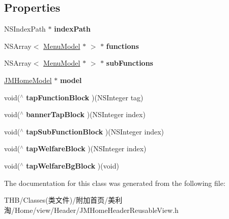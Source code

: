 \subsection*{Properties}
\begin{DoxyCompactItemize}
\item 
\mbox{\label{interface_j_m_home_header_reusable_view_adb50b2a776913d1db70bd35eedb8aba3}} 
N\+S\+Index\+Path $\ast$ {\bfseries index\+Path}
\item 
\mbox{\label{interface_j_m_home_header_reusable_view_a8131cf2ada1beb3faed5878a13f4f31c}} 
N\+S\+Array$<$ \mbox{\hyperlink{interface_menu_model}{Menu\+Model}} $\ast$ $>$ $\ast$ {\bfseries functions}
\item 
\mbox{\label{interface_j_m_home_header_reusable_view_a5b5470a36440fdccae6e044503863e02}} 
N\+S\+Array$<$ \mbox{\hyperlink{interface_menu_model}{Menu\+Model}} $\ast$ $>$ $\ast$ {\bfseries sub\+Functions}
\item 
\mbox{\label{interface_j_m_home_header_reusable_view_a053592ca2cb99bed730558da23bdcfd2}} 
\mbox{\hyperlink{interface_j_m_home_model}{J\+M\+Home\+Model}} $\ast$ {\bfseries model}
\item 
\mbox{\label{interface_j_m_home_header_reusable_view_a33a3d047411431da3ef8d357ba5f98c1}} 
void($^\wedge$ {\bfseries tap\+Function\+Block} )(N\+S\+Integer tag)
\item 
\mbox{\label{interface_j_m_home_header_reusable_view_a9eef99242bd60197c3a7796b5526474f}} 
void($^\wedge$ {\bfseries banner\+Tap\+Block} )(N\+S\+Integer index)
\item 
\mbox{\label{interface_j_m_home_header_reusable_view_a9cb091c48147e5ee773d2581c586e92d}} 
void($^\wedge$ {\bfseries tap\+Sub\+Function\+Block} )(N\+S\+Integer index)
\item 
\mbox{\label{interface_j_m_home_header_reusable_view_ad609cd99586dc02fa97f2193877807ec}} 
void($^\wedge$ {\bfseries tap\+Welfare\+Block} )(N\+S\+Integer index)
\item 
\mbox{\label{interface_j_m_home_header_reusable_view_a5778db2206094e8ba2e8d768dbd4a696}} 
void($^\wedge$ {\bfseries tap\+Welfare\+Bg\+Block} )(void)
\end{DoxyCompactItemize}


The documentation for this class was generated from the following file\+:\begin{DoxyCompactItemize}
\item 
T\+H\+B/\+Classes(类文件)/附加首页/美利淘/\+Home/view/\+Header/J\+M\+Home\+Header\+Reusable\+View.\+h\end{DoxyCompactItemize}
